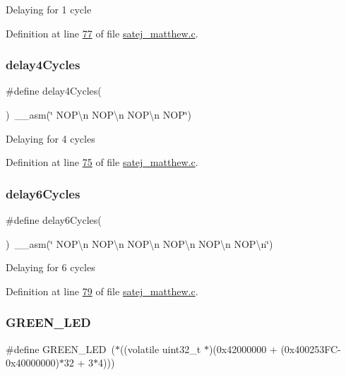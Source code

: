 Delaying for 1 cycle 

Definition at line \mbox{\hyperlink{satej__matthew_8c_source_l00077}{77}} of file \mbox{\hyperlink{satej__matthew_8c_source}{satej\+\_\+matthew.\+c}}.

\mbox{\label{satej__matthew_8c_a2ab1667016c16a6f0a44904c63a6f188}} 
\subsubsection{\texorpdfstring{delay4Cycles}{delay4Cycles}}
{\footnotesize\ttfamily \#define delay4\+Cycles(\begin{DoxyParamCaption}{ }\end{DoxyParamCaption})~\+\_\+\+\_\+asm(\char`\"{} N\+O\+P\textbackslash{}n N\+O\+P\textbackslash{}n N\+O\+P\textbackslash{}n N\+OP\char`\"{})}

Delaying for 4 cycles 

Definition at line \mbox{\hyperlink{satej__matthew_8c_source_l00075}{75}} of file \mbox{\hyperlink{satej__matthew_8c_source}{satej\+\_\+matthew.\+c}}.

\mbox{\label{satej__matthew_8c_aebf11bb4f185afba013bb3946fd88992}} 
\subsubsection{\texorpdfstring{delay6Cycles}{delay6Cycles}}
{\footnotesize\ttfamily \#define delay6\+Cycles(\begin{DoxyParamCaption}{ }\end{DoxyParamCaption})~\+\_\+\+\_\+asm(\char`\"{} N\+O\+P\textbackslash{}n N\+O\+P\textbackslash{}n N\+O\+P\textbackslash{}n N\+O\+P\textbackslash{}n N\+O\+P\textbackslash{}n N\+O\+P\textbackslash{}n\char`\"{})}

Delaying for 6 cycles 

Definition at line \mbox{\hyperlink{satej__matthew_8c_source_l00079}{79}} of file \mbox{\hyperlink{satej__matthew_8c_source}{satej\+\_\+matthew.\+c}}.

\mbox{\label{satej__matthew_8c_a01649d652fa50957c6ef3c32b1238038}} 
\subsubsection{\texorpdfstring{GREEN\_LED}{GREEN\_LED}}
{\footnotesize\ttfamily \#define G\+R\+E\+E\+N\+\_\+\+L\+ED~($\ast$((volatile uint32\+\_\+t $\ast$)(0x42000000 + (0x400253\+F\+C-\/0x40000000)$\ast$32 + 3$\ast$4)))}

